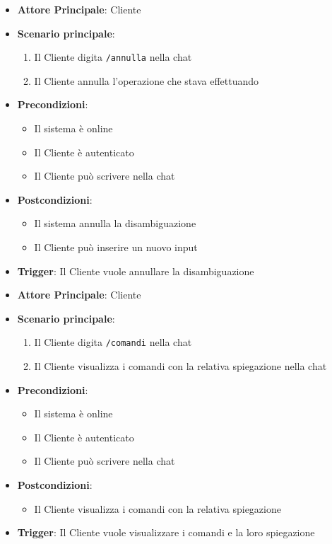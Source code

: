 \label{uc_44.5}
\begin{itemize}
    \item \textbf{Attore Principale}: Cliente
	\item \textbf{Scenario principale}:
	\begin{enumerate}
		\item Il Cliente digita \texttt{/annulla} nella chat
		\item Il Cliente annulla l'operazione che stava effettuando
	\end{enumerate}
	\item \textbf{Precondizioni}:
	\begin{itemize}
		\item Il sistema è online 
		\item Il Cliente è autenticato
		\item Il Cliente può scrivere nella chat
	\end{itemize}
	\item \textbf{Postcondizioni}:
	\begin{itemize}
		\item Il sistema annulla la disambiguazione
		\item Il Cliente può inserire un nuovo input
	\end{itemize}
	\item \textbf{Trigger}: Il Cliente vuole annullare la disambiguazione
\end{itemize}

\label{uc_44.6}
\begin{itemize}
    \item \textbf{Attore Principale}: Cliente
	\item \textbf{Scenario principale}:
	\begin{enumerate}
		\item Il Cliente digita \texttt{/comandi} nella chat
		\item Il Cliente visualizza i comandi con la relativa spiegazione nella chat
	\end{enumerate}
	\item \textbf{Precondizioni}:
	\begin{itemize}
		\item Il sistema è online 
		\item Il Cliente è autenticato
		\item Il Cliente può scrivere nella chat
	\end{itemize}
	\item \textbf{Postcondizioni}:
	\begin{itemize}
		\item Il Cliente visualizza i comandi con la relativa spiegazione
	\end{itemize}
	\item \textbf{Trigger}: Il Cliente vuole visualizzare i comandi e la loro spiegazione
\end{itemize}
